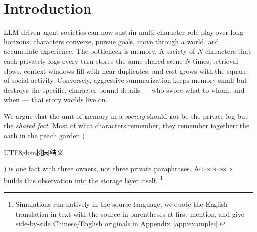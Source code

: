 \documentclass[11pt]{article}
\newcommand{\sysname}{\textsc{Agentsensus}}
\begin{document}
\section{Introduction}
\label{sec:intro}

LLM-driven agent societies can now sustain multi-character role-play over long
horizons: characters converse, pursue goals, move through a world, and
accumulate experience. The bottleneck is memory. A society of $N$ characters
that each privately logs every turn stores the same shared scene $N$ times;
retrieval slows, context windows fill with near-duplicates, and cost grows with
the square of social activity. Conversely, aggressive summarization keeps
memory small but destroys the specific, character-bound details --- who swore
what to whom, and when --- that story worlds live on.

We argue that the unit of memory in a \emph{society} should not be the private
log but the \emph{shared fact}. Most of what characters remember, they remember
together: the oath in the peach garden (\begin{CJK}{UTF8}{gbsn}桃园结义\end{CJK})
is one fact with three owners, not three private paraphrases. \sysname{} builds
this observation into the storage layer itself.
\footnote{Simulations run natively in the source language; we quote the English
translation in text with the source in parentheses at first mention, and give
side-by-side Chinese/English originals in Appendix~\ref{app:examples}.}
\end{document}
